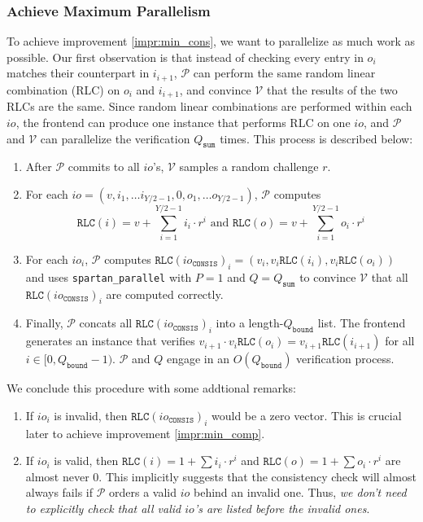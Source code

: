 \documentclass{article}
\newcommand{\code}{\texttt}
\newcommand{\Qbound}{Q_{\mathtt{bound}}}
\newcommand{\Qsum}{Q_{\mathtt{sum}}}
\renewcommand{\P}{\mathcal{P}}
\newcommand{\V}{\mathcal{V}}
\newcommand{\RLC}{\mathtt{RLC}}
\newcommand{\ioc}{io_{\mathtt{CONSIS}}}
\begin{document}
\subsubsection{Achieve Maximum Parallelism}

To achieve improvement \ref{impr:min_cons}, we want to parallelize as much work as possible. Our first observation is that instead of checking every entry in $o_i$ matches their counterpart in $i_{i + 1}$, $\P$ can perform the same random linear combination (RLC) on $o_i$ and $i_{i + 1}$, and convince $\V$ that the results of the two RLCs are the same. Since random linear combinations are performed within each $io$, the frontend can produce one instance that performs RLC on one $io$, and $\P$ and $\V$ can parallelize the verification $\Qsum$ times. This process is described below:
\begin{enumerate}
    \item After $\P$ commits to all $io$'s, $\V$ samples a random challenge $r$.
    \item For each $io = (v, i_1, \dots i_{Y/2 - 1}, 0, o_1, \dots o_{Y/2 - 1})$, $\P$ computes
    $$\displaystyle\RLC(i) = v + \sum_{i = 1}^{Y/2 - 1} i_i\cdot r^i \mbox{ and } \RLC(o) = v + \sum_{i = 1}^{Y/2 - 1} o_i\cdot r^i$$
    \item For each $io_i$, $\P$ computes $\RLC(\ioc)_i = (v_i, v_i\RLC(i_i), v_i\RLC(o_i))$ and uses \code{spartan\_parallel} with $P = 1$ and $Q = \Qsum$ to convince $\V$ that all $\RLC(\ioc)_i$ are computed correctly.
    \item Finally, $\P$ concats all $\RLC(\ioc)_i$ into a length-$\Qbound$ list. The frontend generates an instance that verifies $v_{i+1}\cdot v_i\RLC(o_i) = v_{i+1}\RLC(i_{i+1})$ for all $i\in [0, \Qbound - 1)$. $\P$ and $Q$ engage in an $O(\Qbound)$ verification process.
\end{enumerate}

We conclude this procedure with some addtional remarks:
\begin{enumerate}
    \item If $io_i$ is invalid, then $\RLC(\ioc)_i$ would be a zero vector. This is crucial later to achieve improvement \ref{impr:min_comp}.
    \item If $io_i$ is valid, then $\RLC(i) = 1 + \sum i_i\cdot r^i$ and $\RLC(o) = 1 + \sum o_i\cdot r^i$ are almost never 0. This implicitly suggests that the consistency check will almost always fails if $\P$ orders a valid $io$ behind an invalid one. Thus, \emph{we don't need to explicitly check that all valid $io$'s are listed before the invalid ones}.
\end{enumerate}
\end{document}
